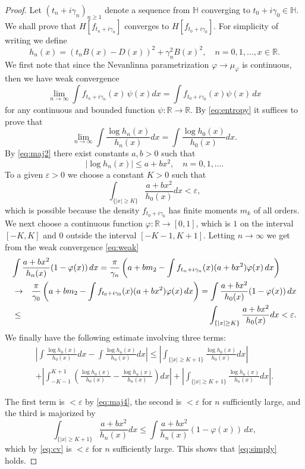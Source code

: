 \documentclass [12pt]{article}
\newcommand{\R}{\mathbb{R}}
\renewcommand{\H}{\mathbb{H}}
\begin{document}
\begin{proof}
Let $(t_n+i\gamma_n)_{n\ge 1}$ denote a sequence from $\H$ converging to $t_0+i\gamma_0\in \H$. We shall prove that $H[f_{t_n+i\gamma_n}]$ converges to
$H[f_{t_0+i\gamma_0}]$.
For simplicity of writing we define
$$
h_n(x)=(t_nB(x)-D(x))^2+\gamma_n^2B(x)^2,\quad n=0,1,\ldots, x\in\R.
$$
We first note that since the Nevanlinna parametrization $\varphi\to \mu_\varphi$  is continuous, then we have weak convergence
\begin{equation}\label{eq:weak}
\lim_{n\to\infty} \int f_{t_n+i\gamma_n}(x)\,\psi(x)dx=
\int f_{t_0+i\gamma_0}(x)\psi(x)\,dx
\end{equation}
for any continuous and bounded function $\psi:\R\to\R$. By \eqref{eq:entropy} it suffices to prove that
\begin{equation}\label{eq:simply}
\lim_{n\to\infty}\int\frac{\log h_n(x)}{h_n(x)}dx=\int\frac{\log h_0(x)}{h_0(x)}dx.
\end{equation}
By \eqref{eq:maj2} there exist constants $a,b>0$ such that
\begin{equation}\label{eq:maj3}
|\log h_n(x)|\le a+bx^2,\quad n=0,1,\ldots.
\end{equation}
To a given $\varepsilon>0$ we choose a constant $K>0$ such that
\begin{equation}\label{eq:maj4}
\int_{\{|x|\ge K\}}\frac{a+bx^2}{h_0(x)}dx<\varepsilon,
\end{equation}
which is possible because the density $f_{t_0+i\gamma_0}$ has finite moments $m_k$ of all orders.
We next choose a continuous function $\varphi:\R\to [0,1]$, which is $1$ on the interval $[-K,K]$ and $0$ outside the interval $[-K-1,K+1]$. Letting $n\to\infty$ we get from the weak convergence \eqref{eq:weak}
\begin{eqnarray}\label{eq:cv}
\lefteqn{\int\frac{a+bx^2}{h_n(x)}(1-\varphi(x))\,dx=\frac{\pi}{\gamma_n}\left(a+bm_2
- \int f_{t_n+i\gamma_n}(x)(a+bx^2)\varphi(x)\,dx\right)} \nonumber\\
&\to& \frac{\pi}{\gamma_0}\left(a+bm_2-\int f_{t_0+i\gamma_0}(x)(a+bx^2)\varphi(x)\,dx\right)=\int\frac{a+bx^2}{h_0(x)}(1-\varphi(x))\,dx\nonumber\\
&\le& \int_{\{|x|\ge K\}}\frac{a+bx^2}{h_0(x)}dx<\varepsilon.
\end{eqnarray}
We finally have the following estimate involving three terms:
\begin{eqnarray*}
\left|\int\frac{\log h_0(x)}{h_0(x)}dx-\int\frac{\log h_n(x)}{h_n(x)}dx\right| \le
\left|\int_{\{|x|\ge K+1\}}\frac{\log h_0(x)}{h_0(x)}dx\right|\\+
\left|\int_{-K-1}^{K+1}\left(\frac{\log h_0(x)}{h_0(x)}-\frac{\log h_n(x)}{h_n(x)}\right)dx\right|
+\left|\int_{\{|x|\ge K+1\}}\frac{\log h_n(x)}{h_n(x)}dx\right|.
\end{eqnarray*}

The first term is $<\varepsilon$ by \eqref{eq:maj4}, the second is $<\varepsilon$ for $n$ sufficiently large, and the third is majorized by
$$
\int_{\{|x|\ge K+1\}}\frac{a+bx^2}{h_n(x)}dx\le \int\frac{a+bx^2}{h_n(x)}(1-\varphi(x))\,dx,
$$
which by \eqref{eq:cv} is $<\varepsilon$ for $n$ sufficiently large. This shows that
\eqref{eq:simply} holds.
\end{proof}
\end{document}
